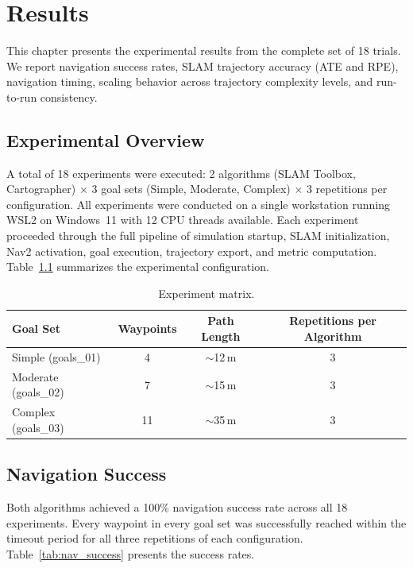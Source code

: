 \chapter{Results}
\label{ch:results}

This chapter presents the experimental results from the complete set of 18 trials. We report navigation success rates, SLAM trajectory accuracy (ATE and RPE), navigation timing, scaling behavior across trajectory complexity levels, and run-to-run consistency.

\section{Experimental Overview}

A total of 18 experiments were executed: 2 algorithms (SLAM Toolbox, Cartographer) $\times$ 3 goal sets (Simple, Moderate, Complex) $\times$ 3 repetitions per configuration. All experiments were conducted on a single workstation running WSL2 on Windows~11 with 12 CPU threads available. Each experiment proceeded through the full pipeline of simulation startup, SLAM initialization, Nav2 activation, goal execution, trajectory export, and metric computation. Table~\ref{tab:experiment_matrix} summarizes the experimental configuration.

\begin{table}[htbp]
\centering
\caption{Experiment matrix.}
\label{tab:experiment_matrix}
\begin{tabular}{lccc}
\toprule
\textbf{Goal Set} & \textbf{Waypoints} & \textbf{Path Length} & \textbf{Repetitions per Algorithm} \\
\midrule
Simple (goals\_01) & 4 & $\sim$12\,m & 3 \\
Moderate (goals\_02) & 7 & $\sim$15\,m & 3 \\
Complex (goals\_03) & 11 & $\sim$35\,m & 3 \\
\bottomrule
\end{tabular}
\end{table}

\section{Navigation Success}

Both algorithms achieved a 100\% navigation success rate across all 18 experiments. Every waypoint in every goal set was successfully reached within the timeout period for all three repetitions of each configuration. Table~\ref{tab:nav_success} presents the success rates.

